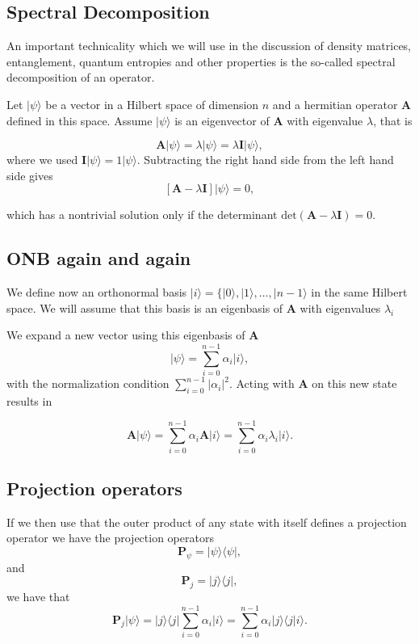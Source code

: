 \subsection{Spectral Decomposition}

An important technicality which we will use in the discussion of
density matrices, entanglement, quantum entropies and other properties
is the so-called spectral decomposition of an operator.

Let $\vert \psi\rangle$ be a vector in a Hilbert space of dimension $n$ and a hermitian operator $\bm{A}$ defined in this
space. Assume $\vert \psi\rangle$ is an eigenvector of $\bm{A}$ with eigenvalue $\lambda$, that is

\[
\bm{A}\vert \psi\rangle = \lambda\vert \psi\rangle = \lambda \bm{I}\vert \psi \rangle,
\]
where we used $\bm{I}\vert \psi \rangle = 1 \vert \psi \rangle$.
Subtracting the right hand side from the left hand side gives
\[
\left[\bm{A}-\lambda \bm{I}\right]\vert \psi \rangle=0,
\]

which has a nontrivial solution only if the determinant
$\mathrm{det}(\bm{A}-\lambda\bm{I})=0$.

\subsection{ONB again and again}

We define now an orthonormal basis $\vert i \rangle =\{\vert 0
\rangle, \vert 1\rangle, \dots, \vert n-1\rangle$ in the same Hilbert
space. We will assume that this basis is an eigenbasis of $\bm{A}$ with eigenvalues $\lambda_i$

We expand a new vector using this eigenbasis of $\bm{A}$
\[
\vert \psi \rangle = \sum_{i=0}^{n-1}\alpha_i\vert i\rangle,
\]
with the normalization condition $\sum_{i=0}^{n-1}\vert \alpha_i\vert^2$.
Acting with $\bm{A}$ on this new state results in

\[
\bm{A}\vert \psi \rangle = \sum_{i=0}^{n-1}\alpha_i\bm{A}\vert i\rangle=\sum_{i=0}^{n-1}\alpha_i\lambda_i\vert i\rangle.
\]

\subsection{Projection operators}

If we then use that the outer product of any state with itself defines a projection operator we have the projection operators
\[
\bm{P}_{\psi} = \vert \psi\rangle\langle \psi\vert,
\]
and
\[
\bm{P}_{j} = \vert j\rangle\langle j\vert,
\]
we have that 
\[
\bm{P}_{j}\vert \psi\rangle=\vert j\rangle\langle j\vert\sum_{i=0}^{n-1}\alpha_i\vert i\rangle=\sum_{i=0}^{n-1}\alpha_i\vert j\rangle\langle j\vert i\rangle.
\]

